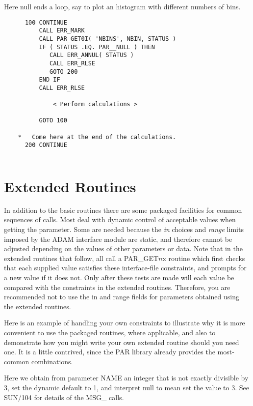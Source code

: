 \documentclass[twoside,11pt]{article}
\newcommand{\xref}[3]{#1}
\newcommand{\xlabel}[1]{}
\begin{document}
Here null ends a loop, say to plot an histogram with different numbers
of bins.
\begin{verbatim}
      100 CONTINUE
          CALL ERR_MARK
          CALL PAR_GET0I( 'NBINS', NBIN, STATUS )
          IF ( STATUS .EQ. PAR__NULL ) THEN
             CALL ERR_ANNUL( STATUS )
             CALL ERR_RLSE
             GOTO 200
          END IF
          CALL ERR_RLSE

              < Perform calculations >

          GOTO 100
          
    *   Come here at the end of the calculations.
      200 CONTINUE 
      
\end{verbatim}

\section{\xlabel{extended_routines}Extended Routines}
\label{se:extended}

In addition to the basic routines there are some packaged facilities for
common sequences of calls.  Most deal with dynamic control of acceptable
values when getting the parameter.  Some are needed because the {\em
in\/} choices and {\em range\/} limits imposed by the {\footnotesize
ADAM} interface module are static, and therefore cannot be adjusted
depending on the values of other parameters or data.  Note that in the
extended routines that follow, all call a PAR\_GET$n$x routine which
first checks that each supplied value satisfies these interface-file
constraints, and prompts for a new value if it does not.  Only after
these tests are made will each value be compared with the constraints in
the extended routines.  Therefore, you are recommended not to use the in
and range fields for parameters obtained using the extended routines. 

Here is an example of handling your own constraints to illustrate why it
is more convenient to use the packaged routines, where applicable, and
also to demonstrate how you might write your own extended routine should
you need one. It is a little contrived, since the PAR library already
provides the most-common combinations. 

Here we obtain from parameter NAME an integer that is not exactly
divisible by 3, set the dynamic default to 1, and interpret null to
mean set the value to 3.  See 
\xref{SUN/104}{sun104}{} for details of the MSG\_ calls. 
\end{document}
